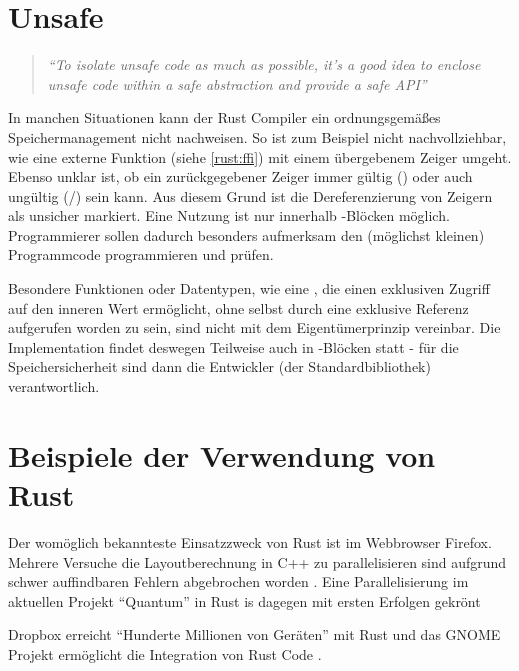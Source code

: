 \section{Unsafe}

\begin{quotation}
	\textit{\enquote{To isolate unsafe code as much as possible, it’s a good idea to enclose unsafe code within a safe abstraction and provide a safe API}}
	\cite[The Rust Programming Language - Unsafe Rust]{rust:book:unsafe}
\end{quotation}

In manchen Situationen kann der Rust Compiler ein ordnungsgemäßes Speichermanagement nicht nachweisen.
So ist zum Beispiel nicht nachvollziehbar, wie eine externe Funktion (siehe \autoref{rust:ffi}) mit einem übergebenem Zeiger umgeht.
Ebenso unklar ist, ob ein zurückgegebener Zeiger immer gültig () oder auch ungültig (/) sein kann.
Aus diesem Grund ist die Dereferenzierung von Zeigern als unsicher markiert.
Eine Nutzung ist nur innerhalb -Blöcken möglich.
Programmierer sollen dadurch besonders aufmerksam den (möglichst kleinen) Programmcode programmieren und prüfen.

Besondere Funktionen oder Datentypen, wie eine , die einen exklusiven Zugriff auf den inneren Wert ermöglicht, ohne selbst durch eine exklusive Referenz aufgerufen worden zu sein, sind nicht mit dem Eigentümerprinzip vereinbar.
Die Implementation findet deswegen Teilweise auch in -Blöcken statt -
für die Speichersicherheit sind dann die Entwickler (der Standardbibliothek) verantwortlich.


\section{Beispiele der Verwendung von Rust}
\label{rust:adaptation}

Der womöglich bekannteste Einsatzzweck von Rust ist im Webbrowser Firefox.
Mehrere Versuche die Layoutberechnung in C++ zu parallelisieren sind aufgrund schwer auffindbaren Fehlern abgebrochen worden \cite{rust:example:firefox}.
Eine Parallelisierung im aktuellen Projekt \enquote{Quantum} in Rust is dagegen mit ersten Erfolgen gekrönt \cite{rust:example:firefox_heise}

Dropbox erreicht \enquote{Hunderte Millionen von Geräten} mit Rust und das GNOME Projekt ermöglicht die Integration von Rust Code \cite{rust:example:two_years}.

